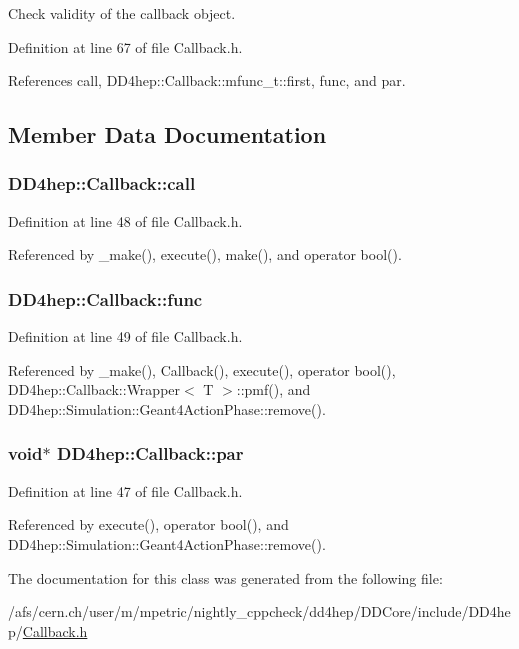 Check validity of the callback object. 

Definition at line 67 of file Callback.h.

References call, DD4hep::Callback::mfunc\_\-t::first, func, and par.

\subsection{Member Data Documentation}
\hypertarget{class_d_d4hep_1_1_callback_af278c88d3680465912b88ad74b0d4cff}{
\subsubsection[{call}]{ {\bf DD4hep::Callback::call}}}
\label{class_d_d4hep_1_1_callback_af278c88d3680465912b88ad74b0d4cff}


Definition at line 48 of file Callback.h.

Referenced by \_\-make(), execute(), make(), and operator bool().\hypertarget{class_d_d4hep_1_1_callback_a9998721dd74f6377d4c5e71629411426}{
\subsubsection[{func}]{ {\bf DD4hep::Callback::func}}}
\label{class_d_d4hep_1_1_callback_a9998721dd74f6377d4c5e71629411426}


Definition at line 49 of file Callback.h.

Referenced by \_\-make(), Callback(), execute(), operator bool(), DD4hep::Callback::Wrapper$<$ T $>$::pmf(), and DD4hep::Simulation::Geant4ActionPhase::remove().\hypertarget{class_d_d4hep_1_1_callback_a0a6ca86dc357627c3c8e9f6233444733}{
\subsubsection[{par}]{\setlength{\rightskip}{0pt plus 5cm}void$\ast$ {\bf DD4hep::Callback::par}}}
\label{class_d_d4hep_1_1_callback_a0a6ca86dc357627c3c8e9f6233444733}


Definition at line 47 of file Callback.h.

Referenced by execute(), operator bool(), and DD4hep::Simulation::Geant4ActionPhase::remove().

The documentation for this class was generated from the following file:\begin{DoxyCompactItemize}
\item 
/afs/cern.ch/user/m/mpetric/nightly\_\-cppcheck/dd4hep/DDCore/include/DD4hep/\hyperlink{_callback_8h}{Callback.h}\end{DoxyCompactItemize}
